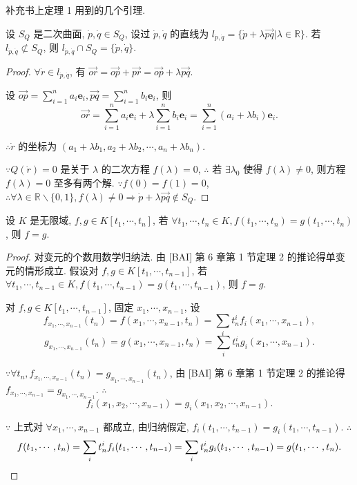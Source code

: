 \documentclass[color=black,device=normal,lang=cn,mode=geye]{elegantnote}
\begin{document}
补充书上定理 1 用到的几个引理.
\begin{lemma}
    设 $S_Q$ 是二次曲面, $\dot{p},\dot{q}\in S_Q$, 设过 $\dot{p},\dot{q}$ 的直线为 $l_{\dot{p},\dot{q}}=\{\dot{p}+\lambda\overrightarrow{pq}|\lambda\in\mathbb{R}\}$. 若 $l_{\dot{p},\dot{q}}\not\subset S_Q$, 则 $l_{\dot{p},\dot{q}}\cap S_Q=\{\dot{p},\dot{q}\}$.
\end{lemma}
\begin{proof}
    $\forall\dot{r}\in l_{\dot{p},\dot{q}}$, 有 $\overrightarrow{or}=\overrightarrow{op}+\overrightarrow{pr}=\overrightarrow{op}+\lambda\overrightarrow{pq}$.

    设 $\overrightarrow{op}=\sum\limits_{i=1}^na_i\boldsymbol{e}_i,\overrightarrow{pq}=\sum\limits_{i=1}^nb_i\boldsymbol{e}_i$, 则
    \[\overrightarrow{or}=\sum\limits_{i=1}^na_i\boldsymbol{e}_i+\lambda\sum\limits_{i=1}^nb_i\boldsymbol{e}_i=\sum\limits_{i=1}^n(a_i+\lambda b_i)\boldsymbol{e}_i.\]

    $\therefore\dot{r}$ 的坐标为 $(a_1+\lambda b_1,a_2+\lambda b_2,\cdots,a_n+\lambda b_n)$.

    $\because Q(\dot{r})=0$ 是关于 $\lambda$ 的二次方程 $f(\lambda)=0$, $\therefore$ 若 $\exists\lambda_0$ 使得 $f(\lambda)\neq0$, 则方程 $f(\lambda)=0$ 至多有两个解. $\because f(0)=f(1)=0$, $\therefore\forall\lambda\in\mathbb{R}\backslash\{0,1\},f(\lambda)\neq0\Rightarrow\dot{p}+\lambda\overrightarrow{pq}\notin S_Q$.
\end{proof}
\begin{lemma}\label{l2.2}
    设 $K$ 是无限域, $f,g\in K[t_1,\cdots,t_n]$, 若 $\forall t_1,\cdots,t_n\in K,f(t_1,\cdots,t_n)=g(t_1,\cdots,t_n)$, 则 $f=g$.
\end{lemma}
\begin{proof}
    对变元的个数用数学归纳法. 由 [BAI] 第 6 章第 1 节定理 2 的推论得单变元的情形成立. 假设对 $f,g\in K[t_1,\cdots,t_{n-1}]$, 若 $\forall t_1,\cdots,t_{n-1}\in K,f(t_1,\cdots,t_{n-1})=g(t_1,\cdots,t_{n-1})$, 则 $f=g$.

    对 $f,g\in K[t_1,\cdots,t_{n-1}]$, 固定 $x_1,\cdots,x_{n-1}$, 设
    \[f_{x_1,\cdots,x_{n-1}}(t_n)=f(x_1,\cdots,x_{n-1},t_n)=\sum\limits_it_n^if_i(x_1,\cdots,x_{n-1}),\]
    \[g_{x_1,\cdots,x_{n-1}}(t_n)=g(x_1,\cdots,x_{n-1},t_n)=\sum\limits_it_n^ig_i(x_1,\cdots,x_{n-1}).\]

    $\because\forall t_n,f_{x_1,\cdots,x_{n-1}}(t_n)=g_{x_1,\cdots,x_{n-1}}(t_n)$, 由 [BAI] 第 6 章第 1 节定理 2 的推论得 $f_{x_1,\cdots,x_{n-1}}=g_{x_1,\cdots,x_{n-1}}$. $\therefore$
    \[f_i(x_1,x_2,\cdots,x_{n-1})=g_i(x_1,x_2,\cdots,x_{n-1}).\]

    $\because$ 上式对 $\forall x_1,\cdots,x_{n-1}$ 都成立, 由归纳假定, $f_i(t_1,\cdots,t_{n-1})=g_i(t_1,\cdots,t_{n-1})$. $\therefore$
    \[f(t_1,\cdots,t_n)=\sum\limits_it_n^if_i(t_1,\cdots,t_{n-1})=\sum\limits_it_n^ig_i(t_1,\cdots,t_{n-1})=g(t_1,\cdots,t_n).\qedhere\]
\end{proof}
\end{document}
